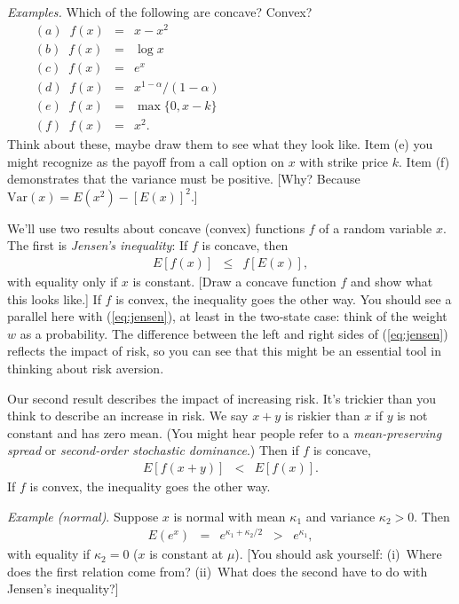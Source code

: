 \documentclass[11pt]{article}
\begin{document}
{\it Examples.\/}
Which of the following are concave?  Convex?
\begin{eqnarray*}
    (a) \;\; f(x) &=& x - x^2 \\
    (b) \;\; f(x) &=& \log x  \\
    (c) \;\; f(x) &=& e^x \\
    (d) \;\; f(x) &=& x^{1-\alpha}/(1-\alpha) \\
    (e) \;\; f(x) &=& \max \{ 0, x-k \}  \\
    (f) \;\; f(x) &=& x^2.
    \phantom{xxxxxxxxxxxxxxxxxxxxxxxxxxxxxxxxxxxxxxx}
\end{eqnarray*}
Think about these, maybe draw them to see what they look like.
Item (e) you might recognize as the payoff from
a call option on $x$ with strike price $k$.
Item (f) demonstrates that the variance must be positive.
[Why?  Because $\mbox{Var}(x) = E(x^2) - [E(x)]^2$.]


We'll use two results about concave (convex) functions $f$
of a random variable $x$.
The first is {\it Jensen's inequality\/}:
If $f$ is concave, then
\begin{eqnarray}
    E [f(x)] &\leq& f [E(x)] ,
    \label{eq:jensen}
\end{eqnarray}
with equality only if $x$ is constant.
[Draw a concave function $f$ and show what this looks like.]
If $f$ is convex, the inequality goes the other way.
You should see a parallel here with (\ref{eq:jensen}), at least in the two-state case:
think of the weight $w$ as a probability.
The difference between the left and right sides of (\ref{eq:jensen}) reflects
the impact of risk, so you can see that this might be
an essential tool in thinking about risk aversion.

Our second result describes the impact of increasing risk.
It's trickier than you think to describe an increase in risk.
We say $ x+y$ is riskier than $x$ if $y$ is not constant and has zero mean.
(You might hear people refer to a {\it mean-preserving spread\/} or
{\it second-order stochastic dominance\/}.) Then if $f$ is concave,
\begin{eqnarray*}
    E[ f(x + y)] &<& E[f(x)] .
\end{eqnarray*}
If $f$ is convex, the inequality goes the other way.

{\it Example (normal)\/}.
Suppose $x$ is normal with mean $\kappa_1$ and variance $\kappa_2>0$.
Then
\begin{eqnarray*}
    E \left( e^x \right) &=&  e^{\kappa_1 + \kappa_2/2}
            \;\;>\;\; e^{\kappa_1},
\end{eqnarray*}
with equality if $\kappa_2 = 0$ ($x$ is constant at $\mu$).
[You should ask yourself:
(i)~Where does the first relation come from?
(ii)~What does the second have to do with Jensen's inequality?]
\end{document}
